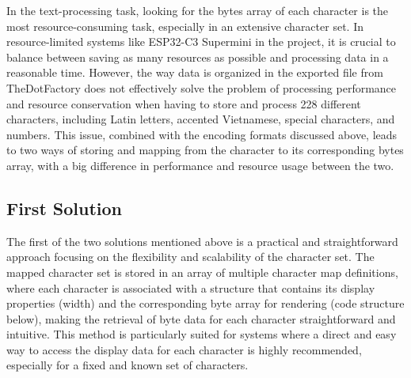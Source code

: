 \documentclass[../Main.tex]{subfiles}
\begin{document}
\begin{center}
    {\fontsize{10pt}{8pt}\selectfont 
    }
\end{center}

In the text-processing task, looking for the bytes array of each character is the most resource-consuming task, especially in an extensive character set. In resource-limited systems like ESP32-C3 Supermini in the project, it is crucial to balance between saving as many resources as possible and processing data in a reasonable time. However, the way data is organized in the exported file from TheDotFactory does not effectively solve the problem of processing performance and resource conservation when having to store and process 228 different characters, including Latin letters, accented Vietnamese, special characters, and numbers. This issue, combined with the encoding formats discussed above, leads to two ways of storing and mapping from the character to its corresponding bytes array, with a big difference in performance and resource usage between the two.

\subsection{First Solution}
The first of the two solutions mentioned above is a practical and straightforward approach focusing on the flexibility and scalability of the character set. The mapped character set is stored in an array of multiple character map definitions, where each character is associated with a structure that contains its display properties (width) and the corresponding byte array for rendering (code structure below), making the retrieval of byte data for each character straightforward and intuitive. This method is particularly suited for systems where a direct and easy way to access the display data for each character is highly recommended, especially for a fixed and known set of characters.
\end{document}
